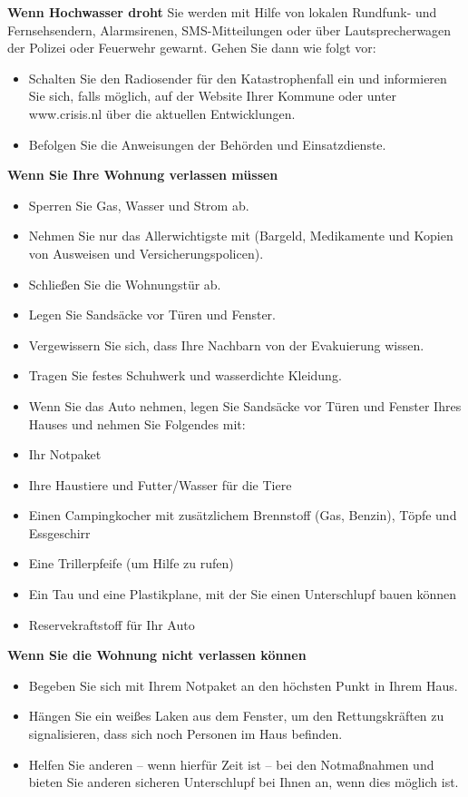\textnormal{\newline\bfseries Wenn Hochwasser droht}
\newline
\textnormal{Sie werden mit Hilfe von lokalen Rundfunk- und Fernsehsendern, 
Alarmsirenen, SMS-Mitteilungen oder über Lautsprecherwagen der Polizei
 oder Feuerwehr gewarnt. Gehen Sie dann wie folgt vor:}
\begin{itemize}  
\item Schalten Sie den Radiosender für den Katastrophenfall ein und informieren Sie sich, falls möglich, auf der Website Ihrer Kommune oder unter www.crisis.nl über die aktuellen Entwicklungen.
\item Befolgen Sie die Anweisungen der Behörden und Einsatzdienste.
\end{itemize}  
\textnormal{\newline\bfseries Wenn Sie Ihre Wohnung verlassen müssen}
\begin{itemize}  
 \item   Sperren Sie Gas, Wasser und Strom ab.
\item    Nehmen Sie nur das Allerwichtigste mit (Bargeld, Medikamente und Kopien von Ausweisen und Versicherungspolicen).
\item    Schließen Sie die Wohnungstür ab.
 \item   Legen Sie Sandsäcke vor Türen und Fenster.
 \item   Vergewissern Sie sich, dass Ihre Nachbarn von der Evakuierung wissen.
\item    Tragen Sie festes Schuhwerk und wasserdichte Kleidung.
\item    Wenn Sie das Auto nehmen, legen Sie Sandsäcke vor Türen und Fenster Ihres Hauses und nehmen Sie Folgendes mit:
\item    Ihr Notpaket
\item    Ihre Haustiere und Futter/Wasser für die Tiere
\item    Einen Campingkocher mit zusätzlichem Brennstoff (Gas, Benzin), Töpfe und Essgeschirr
 \item   Eine Trillerpfeife (um Hilfe zu rufen)
 \item   Ein Tau und eine Plastikplane, mit der Sie einen Unterschlupf bauen können
 \item   Reservekraftstoff für Ihr Auto
\end{itemize}  
\textnormal{\newline\bfseries Wenn Sie die Wohnung nicht verlassen können}
\begin{itemize}  
   \item Begeben Sie sich mit Ihrem Notpaket an den höchsten Punkt in Ihrem Haus.
   \item Hängen Sie ein weißes Laken aus dem Fenster, um den Rettungskräften zu signalisieren, dass sich noch Personen im Haus befinden.
  \item  Helfen Sie anderen – wenn hierfür Zeit ist – bei den Notmaßnahmen und bieten Sie anderen sicheren Unterschlupf bei Ihnen an, wenn dies möglich ist.
\end{itemize}  
